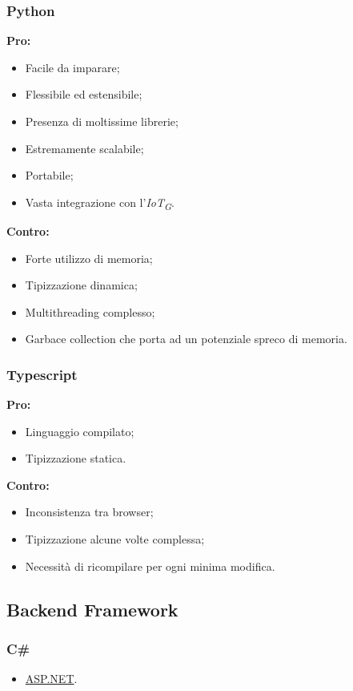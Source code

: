 \documentclass[a4paper, 12pt]{article}
\begin{document}
\subsubsection{Python}
\textbf{Pro:}
\begin{itemize}
    \item Facile da imparare;
    \item Flessibile ed estensibile;
    \item Presenza di moltissime librerie;
    \item Estremamente scalabile;
    \item Portabile;
    \item Vasta integrazione con l'\textit{IoT\textsubscript{G}}.
\end{itemize}
\vspace*{0.5cm}
\textbf{Contro:}
\begin{itemize}
    \item Forte utilizzo di memoria;
    \item Tipizzazione dinamica;
    \item Multithreading complesso;
    \item Garbace collection che porta ad un potenziale spreco di memoria.
\end{itemize}
\subsubsection{Typescript}
\textbf{Pro:}
\begin{itemize}
    \item Linguaggio compilato;
    \item Tipizzazione statica.
\end{itemize}
\vspace*{0.5cm}
\textbf{Contro:}
\begin{itemize}
    \item Inconsistenza tra browser;
    \item Tipizzazione alcune volte complessa;
    \item Necessità di ricompilare per ogni minima modifica.
\end{itemize}
\subsection{Backend Framework}
\subsubsection{C\#}
\begin{itemize}
    \item \href{https://dotnet.microsoft.com/en-us/apps/aspnet}{ASP.NET}.
\end{itemize}
\end{document}
